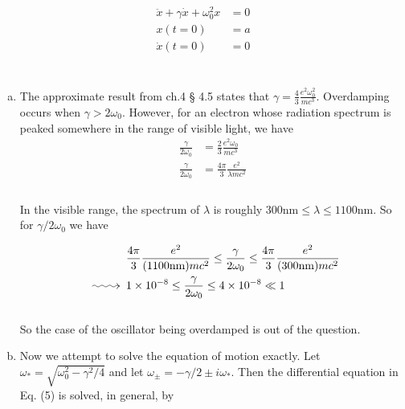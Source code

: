 \documentclass[]{article}
\makeatletter
\newcommand{\longsquiggly}{\xymatrix{{}\ar@{~>}[r]&{}}}
\makeatother
\begin{document}
\begin{equation}
\begin{aligned}
\ddot{x} +  \gamma \dot{x} + \omega_0^2 x & = 0\\
x(t=0) & = a \\
\dot{x}(t=0) & = 0 \\
\end{aligned}
\end{equation} \\

\begin{enumerate}[a)]

\item The approximate result from ch.4 § 4.5 states that $\gamma  = \frac{4}{3} \frac{e^2\omega_0^2}{mc^3} $. Overdamping occurs when $\gamma > 2\omega_0$. However, for an electron whose radiation spectrum is peaked somewhere in the range of visible light, we have \\

\begin{equation}
\begin{aligned}
\frac{\gamma}{2\omega_0}  & = \frac{2}{3} \frac{e^2\omega_0}{mc^3} \\
\frac{\gamma}{2\omega_0}  & = \frac{4\pi}{3} \frac{e^2  }{ \lambda mc^2}  \\
\end{aligned}
\end{equation} \\

In the visible range, the spectrum of $\lambda$ is roughly $ 300 \text{nm} \le \lambda \le 1100 \text{nm}$. So for $\gamma / 2\omega_0$ we have

\begin{equation}
\begin{aligned}
& \frac{4\pi}{3} \frac{e^2  }{ (1100 \text{nm})  mc^2}  \le \frac{\gamma}{2\omega_0}  \le \frac{4\pi}{3} \frac{e^2  }{ (300 \text{nm})  mc^2}  \\
\longsquiggly & 1\times 10^{-8} \le \frac{\gamma}{2\omega_0}  \le 4\times 10^{-8}  \ll 1\\
\end{aligned}
\end{equation} \\

So the case of the oscillator being overdamped is out of the question. \\

\item Now we attempt to solve the equation of motion exactly. Let $\omega_* = \sqrt{\omega_0^2 - \gamma^2/4}$ and let $\omega_\pm = -\gamma/2 \pm i\omega_*$. Then the differential equation in Eq. (5) is solved, in general, by \\


\end{enumerate}
\end{document}
